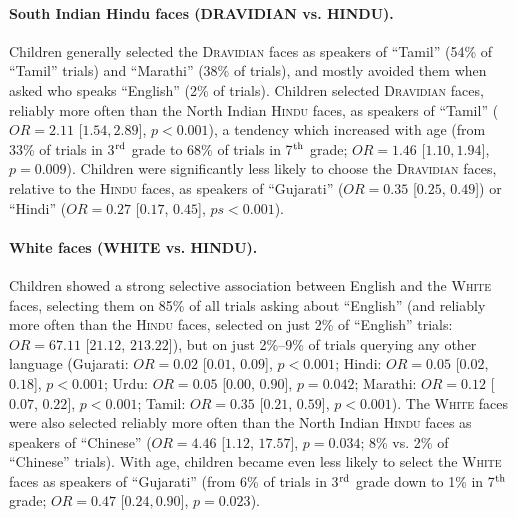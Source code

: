 \documentclass{foushee-adapted-preprint}
\begin{document}
\paragraph{South Indian Hindu faces {(D{\small{RAVIDIAN}} vs. H{\small{INDU}})}.} 
Children generally selected the \textsc{Dravidian} faces as speakers of ``Tamil'' (54\% of ``Tamil'' trials) and ``Marathi'' (38\% of trials), and mostly avoided them when asked who speaks ``English'' (2\% of trials). 
Children selected \textsc{Dravidian} faces, reliably more often than the North Indian \textsc{Hindu} faces, as speakers of ``Tamil'' ($OR=2.11$ [$1.54, 2.89]$, $p<0.001$), a tendency which increased with age (from 33\% of trials in 3$^{\textnormal{rd}}$ grade to 68\% of trials in 7$^{\textnormal{th}}$ grade; $OR=1.46$ [$1.10, 1.94]$, $p=0.009$). Children were significantly less likely to choose the \textsc{Dravidian} faces, relative to the \textsc{Hindu} faces, as speakers of ``Gujarati'' ($OR=0.35$ [$0.25$, $0.49$]) or ``Hindi'' ($OR=0.27$ [$0.17$, $0.45$], $ps<0.001$).

\paragraph{White faces {(W{\small{HITE}} vs. H{\small{INDU}})}.}

Children showed a strong selective association between English and the \textsc{White} faces, selecting them on 85\% of all trials asking about ``English'' (and reliably more often than the \textsc{Hindu} faces, selected on just 2\% of ``English'' trials: $OR=67.11$ [$21.12$, $213.22$]), but on just 2\%--9\% of trials querying any other language (Gujarati: $OR=0.02$ [$0.01$, $0.09$], $p<0.001$; Hindi: $OR=0.05$ [$0.02$, $0.18$], $p<0.001$; Urdu: $OR=0.05$ [$0.00$, $0.90$], $p=0.042$; Marathi: $OR=0.12$ [$0.07$, $0.22$], $p<0.001$; Tamil: $OR=0.35$ [$0.21$, $0.59$], $p<0.001$). 
The \textsc{White} faces were also selected reliably more often than the North Indian \textsc{Hindu} faces as speakers of ``Chinese'' ($OR=4.46$ [$1.12$, $17.57$], $p=0.034$; 8\% vs. 2\% of ``Chinese'' trials). 
With age, children became even less likely to select the \textsc{White} faces as speakers of ``Gujarati'' (from 6\% of trials in 3$^{\textnormal{rd}}$ grade down to 1\% in 7$^{\textnormal{th}}$ grade; $OR=0.47$ [$0.24, 0.90]$, $p=0.023$).
\end{document}
